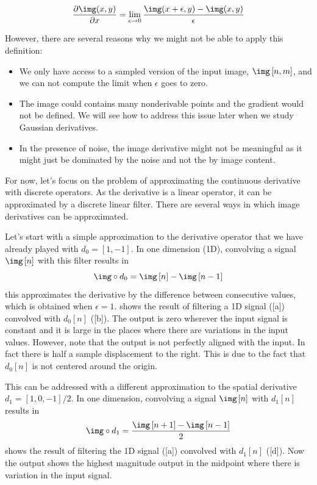 \begin{equation}
\frac{\partial \img(x,y)} {\partial x} = \lim_{\epsilon \to 0} \frac{ \img(x+\epsilon,y) -\img(x,y)} {\epsilon}
\end{equation}

However, there are several reasons why we might not be able to apply this definition:
\begin{itemize}
\item We only have access to a sampled version of the input image, $\img \left[n,m\right]$, and we can not compute the limit when $\epsilon$ goes to zero.
\item The image could contains many nonderivable points and the gradient would not be defined. We will see how to address this issue later when we study Gaussian derivatives.
\item In the presence of noise, the image derivative might not be meaningful as it might just be dominated by the noise and not the by image content. 
\end{itemize}

For now, let's focus on the problem of approximating the continuous derivative with discrete operators. As the derivative is a linear operator, it can be approximated by a discrete linear filter. There are several ways in which image derivatives can be approximated. 

Let's start with a simple approximation to the derivative operator that we have already played with $d_0  = \left[1, -1 \right]$. 
In one dimension (1D), convolving a signal $\img \left[n \right]$ with this filter results in
\begin{equation}
\img \circ d_0 = \img \left[n \right] - \img \left[n-1 \right]
\end{equation}
this approximates the derivative by the difference between consecutive values, which is obtained when $\epsilon=1$.  shows the result of filtering a 1D signal (\fig{\ref{fig:discretederivative}}[a]) convolved with $d_0 \left[n\right]$ (\fig{\ref{fig:discretederivative}}[b]). The output is zero wherever the input signal is constant and it is large in the places where there are variations in the input values. However, note that the output is not perfectly aligned with the input. In fact there is half a sample displacement to the right. This is due to the fact that $d_0 \left[n\right]$ is not centered around the origin. 

This can be addressed with a different approximation to the spatial derivative $d_1  = \left[1, 0, -1 \right]/2$. In one dimension, convolving a signal $\img \left[n \right]$ with $d_1 \left[n\right]$ results in
\begin{equation}
\img \circ d_1 = \frac{\img \left[n+1 \right] - \img \left[n-1 \right]}{2}
\end{equation}
 shows the result of filtering the 1D signal (\fig{\ref{fig:discretederivative}}[a]) convolved with $d_1 \left[n\right]$ (\fig{\ref{fig:discretederivative}}[d]). Now the output shows the highest magnitude output in the midpoint where there is variation in the input signal. 

